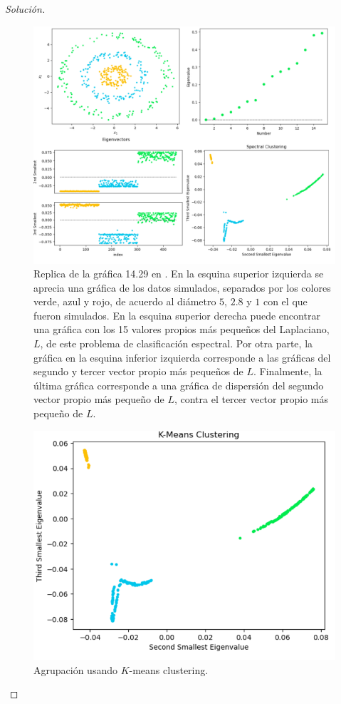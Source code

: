 \documentclass[10.5pt,notitlepage]{article}
\newenvironment{solucion}
  {\begin{proof}[Solución]}
  {\end{proof}}
\theoremstyle{plain}
\begin{document}
\begin{solucion}
\begin{figure}[htb]
    \centering
    \includegraphics[scale = 0.4]{Graph.png}
    \caption{Replica de la gráfica 14.29 en \textcite{hastie_elements_2009}. En la esquina superior izquierda se aprecia una gráfica de los datos simulados, separados por los colores verde, azul y rojo, de acuerdo al diámetro \(5\), \(2.8\) y \(1\) con el que fueron simulados. En la esquina superior derecha puede encontrar una gráfica con los 15 valores propios más pequeños del Laplaciano, \(L\), de este problema de clasificación espectral. Por otra parte, la gráfica en la esquina inferior izquierda corresponde a las gráficas del segundo y tercer vector propio más pequeños de \(L\). Finalmente, la última gráfica corresponde a una gráfica de dispersión del segundo vector propio más pequeño de \(L\), contra el tercer vector propio más pequeño de \(L\). }
    \label{fig:1}
\end{figure}
\begin{figure}[htb]
    \centering
    \includegraphics[scale = 0.4]{K-means.png}
    \caption{Agrupación usando \(K\)-means clustering.}
    \label{fig:2}
\end{figure}

\end{solucion}
\end{document}
